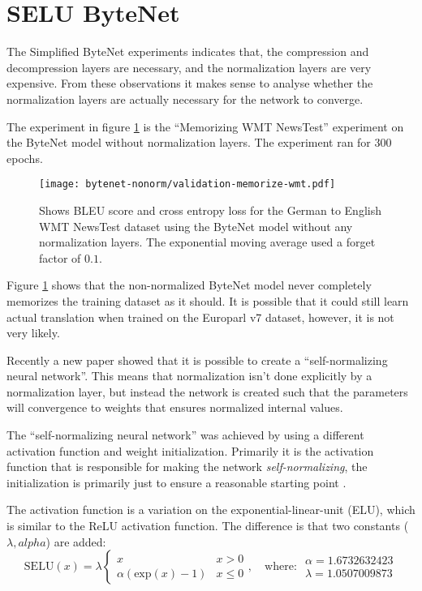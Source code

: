 \section{SELU ByteNet}

The Simplified ByteNet experiments indicates that, the compression and decompression layers are necessary, and the normalization layers are very expensive. From these observations it makes sense to analyse whether the normalization layers are actually necessary for the network to converge.

The experiment in figure \ref{fig:result:selu-bytenet:bytenet-nonorm-wmt} is the ``Memorizing WMT NewsTest'' experiment on the ByteNet model without normalization layers. The experiment ran for 300 epochs.

\begin{figure}[h]
    \centering
    \texttt{[image: bytenet-nonorm/validation-memorize-wmt.pdf]}
    \caption{Shows BLEU score and cross entropy loss for the German to English WMT NewsTest dataset using the ByteNet model without any normalization layers. The exponential moving average used a forget factor of $0.1$.}
    \label{fig:result:selu-bytenet:bytenet-nonorm-wmt}
\end{figure}

Figure \ref{fig:result:selu-bytenet:bytenet-nonorm-wmt} shows that the non-normalized ByteNet model never completely memorizes the training dataset as it should. It is possible that it could still learn actual translation when trained on the Europarl v7 dataset, however, it is not very likely.

Recently a new paper showed that it is possible to create a ``self-normalizing neural network''. This means that normalization isn't done explicitly by a normalization layer, but instead the network is created such that the parameters will convergence to weights that ensures normalized internal values.

The ``self-normalizing neural network'' was achieved by using a different activation function and weight initialization. Primarily it is the activation function that is responsible for making the network \textit{self-normalizing}, the initialization is primarily just to ensure a reasonable starting point \cite[https://arxiv.org/pdf/1706.02515.pdf]{selu}.

The activation function is a variation on the exponential-linear-unit (ELU), which is similar to the ReLU activation function. The difference is that two constants ($\lambda, alpha$) are added:
\begin{equation}
\mathrm{SELU}(x) = \lambda \begin{cases}
  x & x > 0 \\
  \alpha (\mathrm{exp}(x) - 1) & x \le 0
\end{cases},\quad \text{where: } \begin{array}{c}
  \alpha = 1.6732632423 \\
  \lambda = 1.0507009873
\end{array}
\end{equation}

